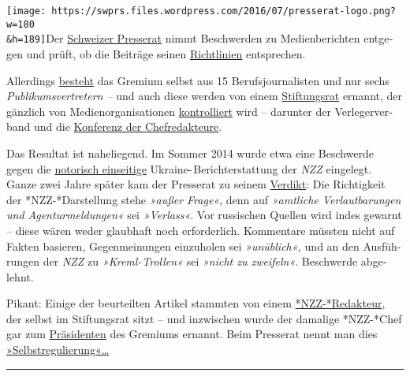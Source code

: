 \texttt{[image: https://swprs.files.wordpress.com/2016/07/presserat-logo.png?w=180\\\&h=189]}Der
\href{https://presserat.ch/}{Schweizer Presse­rat} nimmt Be­schwer­den
zu Me­dien­be­rich­ten ent­ge­gen und prüft, ob die Bei­trä­ge seinen
\href{https://presserat.ch/journalistenkodex/richtlinien/}{Richt­linien}
ent­­spre­chen.

Aller­dings
\href{https://presserat.ch/der-presserat/presseratsmitglieder/}{besteht}
das Gre­mium selbst aus 15 Be­rufs­­jour­­na­­listen und nur sechs
\emph{Pub­li­kums­­ver­­tre­tern --} und auch diese werden von einem
\href{https://presserat.ch/der-presserat/stiftungsratsmitglieder/}{Stiftungs­rat}
er­nannt, der gänz­­lich von Medien­orga­ni­sa­tionen
\href{https://presserat.ch/der-presserat/geschaeftsreglement/}{kon­trol­liert}
wird -- da­run­ter der Ver­leger­ver­band und die
\href{http://chefredaktoren.ch/de_DE/}{Kon­fe­renz der
Chef­re­dak­teure}.

Das Resultat ist naheliegend. Im Som­mer 2014 wurde etwa eine
Be­schwerde gegen die
\href{https://swprs.org/die-nzz-studie/}{no­to­risch ein­sei­tige}
Ukraine-  Bericht­er­stattung der \emph{NZZ} ein­ge­legt. Ganze zwei
Jahre später kam der Presse­rat zu seinem
\href{https://web.archive.org/web/20170606080842/http://presserat.ch/_14_2016.htm}{Verdikt}:
Die Rich­tig­keit der *NZZ-*Dar­­stel­lung stehe \emph{»außer Frage«},
denn auf \emph{»amt­liche Ver­laut­ba­rungen und Agen­tur­mel­dungen«}
sei \emph{»Verlass«}. Vor russischen Quel­len wird in­des ge­warnt --
diese wären weder glaub­haft noch er­for­der­lich. Kom­men­tare müss­ten
nicht auf Fak­ten ba­sie­ren, Ge­gen­mei­nungen ein­zu­holen sei
\emph{»un­üb­lich«,} und an den Aus­füh­rungen der \emph{NZZ} zu
\emph{»Kreml- Trollen«} sei \emph{»nicht zu zwei­feln«}. Be­schwerde
ab­ge­lehnt.

Pikant: Einige der be­ur­teil­ten Ar­tikel stam­mten von einem
\href{http://www.nzz.ch/international/europa/beschwerde-beim-presserat-kritik-an-nzz-abgewiesen-ld.104814}{*NZZ-*Redak­teur},
der selbst im Stiftungsrat sitzt -- und inzwischen wurde der damalige
*NZZ-*Chef gar zum
\href{http://www.nzz.ch/schweiz/medien-selbstregulierung-markus-spillmann-wird-praesident-des-presserats-ld.135619}{Präsidenten}
des Gremiums ernannt. Beim Presse­rat nennt man dies
\href{https://de.wikipedia.org/wiki/Schweizer_Presserat}{»Selbst­re­gu­lierung«\ldots{}}

\begin{center}\rule{0.5\linewidth}{\linethickness}\end{center}

